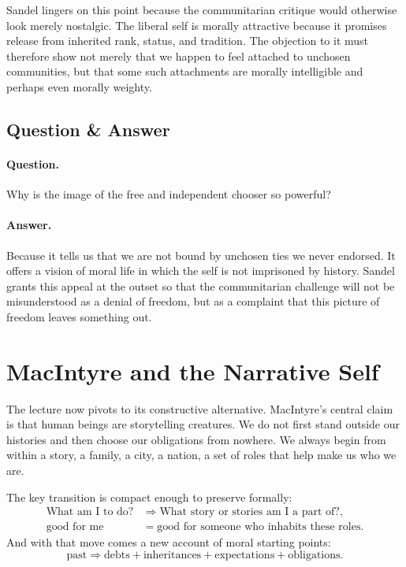 Sandel lingers on this point because the communitarian critique would otherwise look merely nostalgic. The liberal self is morally attractive because it promises release from inherited rank, status, and tradition. The objection to it must therefore show not merely that we happen to feel attached to unchosen communities, but that some such attachments are morally intelligible and perhaps even morally weighty.

\subsection{Question \& Answer}

\paragraph{Question.} Why is the image of the free and independent chooser so powerful?

\paragraph{Answer.} Because it tells us that we are not bound by unchosen ties we never endorsed. It offers a vision of moral life in which the self is not imprisoned by history. Sandel grants this appeal at the outset so that the communitarian challenge will not be misunderstood as a denial of freedom, but as a complaint that this picture of freedom leaves something out.

\section{MacIntyre and the Narrative Self}

The lecture now pivots to its constructive alternative. MacIntyre's central claim is that human beings are storytelling creatures. We do not first stand outside our histories and then choose our obligations from nowhere. We always begin from within a story, a family, a city, a nation, a set of roles that help make us who we are.

The key transition is compact enough to preserve formally:
\begin{align}
\text{What am I to do?} &\Longrightarrow \text{What story or stories am I a part of?}, \\
\text{good for me} &= \text{good for someone who inhabits these roles}.
\end{align}
And with that move comes a new account of moral starting points:
\begin{equation}
\text{past} \Longrightarrow \text{debts} + \text{inheritances} + \text{expectations} + \text{obligations}.
\end{equation}

